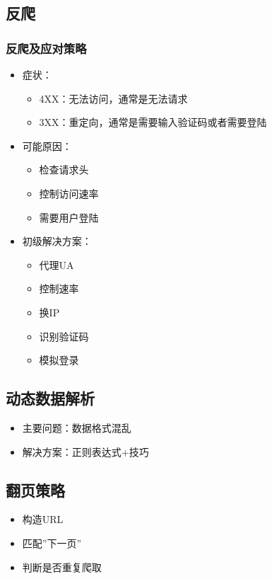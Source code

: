 \documentclass{beamer}
\begin{document}
\subsection{反爬}
\begin{frame}[allowframebreaks]
\frametitle{反爬及应对策略}
\begin{itemize}
  \item 症状：
  \begin{itemize}
    \item 4XX：无法访问，通常是无法请求
    \item 3XX：重定向，通常是需要输入验证码或者需要登陆
  \end{itemize}
  \item 可能原因：
  \begin{itemize}
    \item 检查请求头
    \item 控制访问速率
    \item 需要用户登陆
  \end{itemize}
  \framebreak
  \item 初级解决方案：
  \begin{itemize}
    \item 代理UA
    \item 控制速率
    \item 换IP
    \item 识别验证码
    \item 模拟登录
  \end{itemize}
\end{itemize}
\end{frame}

\subsection{动态数据解析}
\begin{frame}
\begin{itemize}
  \item 主要问题：数据格式混乱
  \item 解决方案：正则表达式+技巧
\end{itemize}
\end{frame}

\subsection{翻页策略}
\begin{frame}
\begin{itemize}
  \item 构造URL
  \item 匹配''下一页''
  \item 判断是否重复爬取
\end{itemize}
\end{frame}
\end{document}
